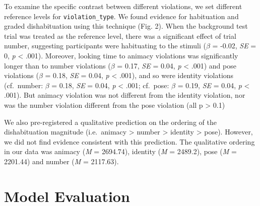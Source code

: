 \documentclass[10pt, letterpaper]{article}
\begin{document}
To examine the specific contrast between different violations, we set
different reference levels for \texttt{violation\_type}. We found
evidence for habituation and graded dishabituation using this technique
(Fig. 2). When the background test trial was treated as the reference
level, there was a significant effect of trial number, suggesting
participants were habituating to the stimuli (\(\beta\) = -0.02,
\emph{SE} = 0, \emph{p} \textless{} .001). Moreover, looking time to
animacy violations was significantly longer than to number violations
(\(\beta\) = 0.17, \emph{SE} = 0.04, \emph{p} \textless{} .001) and pose
violations (\(\beta\) = 0.18, \emph{SE} = 0.04, \emph{p} \textless{}
.001), and so were identity violations (cf.~number: \(\beta\) = 0.18,
\emph{SE} = 0.04, \emph{p} \textless{} .001; cf.~pose: \(\beta\) = 0.19,
\emph{SE} = 0.04, \emph{p} \textless{} .001). But animacy violation was
not different from the identity violation, nor was the number violation
different from the pose violation (all p \textgreater{} 0.1)

We also pre-registered a qualitative prediction on the ordering of the
dishabituation magnitude (i.e.~animacy \textgreater{} number
\textgreater{} identity \textgreater{} pose). However, we did not find
evidence consistent with this prediction. The qualitative ordering in
our data was animacy (\emph{M} = 2694.74), identity (\emph{M} = 2489.2),
pose (\emph{M} = 2201.44) and number (\emph{M} = 2117.63).

\hypertarget{model-evaluation}{%
\section{Model Evaluation}\label{model-evaluation}}
\end{document}
